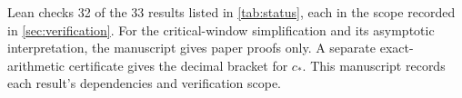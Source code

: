 Lean checks 32 of the 33 results listed in \cref{tab:status}, each in the
scope recorded in \cref{sec:verification}. For the critical-window
simplification and its asymptotic interpretation, the manuscript gives
paper proofs only. A separate exact-arithmetic certificate gives the
decimal bracket for $c_*$. This manuscript records each result's
dependencies and verification scope.

